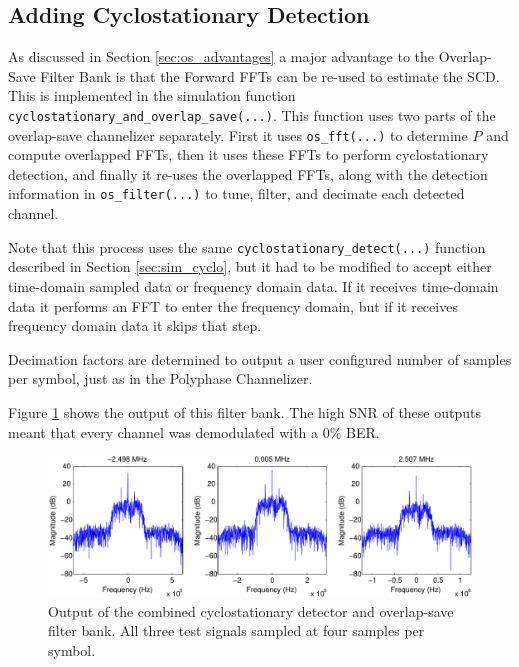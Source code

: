 \documentclass[12pt]{report}
\begin{document}
\subsection{Adding Cyclostationary Detection}
\label{sec:sim_os_cyclo}
As discussed in Section \ref{sec:os_advantages} a major advantage to the
Overlap-Save Filter Bank is that the Forward FFTs can be re-used to estimate
the SCD. This is implemented in the simulation function
\texttt{cyclostationary\_and\_overlap\_save(...)}. This function uses two parts of the
overlap-save channelizer separately.  First it uses \texttt{os\_fft(...)} to
determine $P$ and compute overlapped FFTs, then it uses these FFTs to perform
cyclostationary detection, and finally it re-uses the overlapped FFTs, along
with the detection information in \texttt{os\_filter(...)} to tune, filter, and
decimate each detected channel.

Note that this process uses the same \texttt{cyclostationary\_detect(...)}
function described in Section \ref{sec:sim_cyclo}, but it had to be modified to
accept either time-domain sampled data or frequency domain data. If it receives
time-domain data it performs an FFT to enter the frequency domain, but if it
receives frequency domain data it skips that step.

Decimation factors are determined to output a user configured number of samples
per symbol, just as in the Polyphase Channelizer.

Figure \ref{fig:cyclo_os_results} shows the output of this filter bank. The
high SNR of these outputs meant that every channel was demodulated with a 0\%
BER.

\begin{figure}[bh!]
    \includegraphics[width=\textwidth]{cyclo_os_results}%
\caption{Output of the combined cyclostationary detector and overlap-save filter bank. All three test signals sampled at four samples per symbol.}
\label{fig:cyclo_os_results}
\end{figure}
\end{document}
